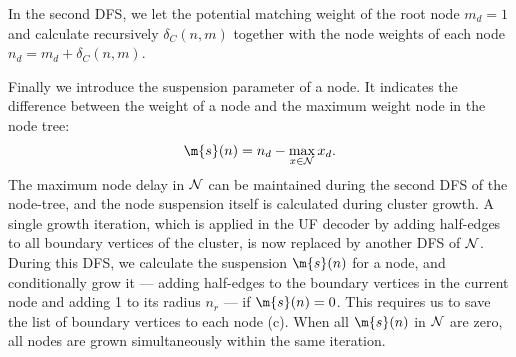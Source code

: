 
In the second DFS, we let the potential matching weight of the root node $m_d=1$ and calculate recursively $\delta_C(n,m)$ together with the node weights of each node $n_d=m_d+\delta_C(n,m)$. %

Finally we introduce the suspension parameter of a node. It indicates the difference between the weight of a node and the maximum weight node in the node tree:
\begin{equation*}
    \m{s}(n) = n_d - \max_{x \in \nset}{x_d}. 
\end{equation*}
The maximum node delay in $\mathcal{N}$ can be maintained during the second DFS of the node-tree, and the node suspension itself is calculated during cluster growth. A single growth iteration, which is applied in the UF decoder by adding half-edges to all boundary vertices of the cluster, is now replaced by another DFS of $\mathcal{N}$. During this DFS, we calculate the suspension $\m{s}(n)$ for a node, and conditionally grow it --- adding half-edges to the boundary vertices in the current node and adding 1 to its radius $n_r$ --- if $\m{s}(n) = 0$. This requires us to save the list of boundary vertices to each node (c). When all $\m{s}(n)$ in $\mathcal{N}$ are zero, all nodes are grown simultaneously within the same iteration. 


